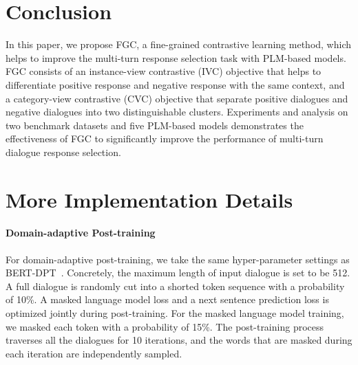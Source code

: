 \documentclass[letterpaper]{article} \usepackage{aaai22}  \usepackage{times}  \usepackage{helvet}  \usepackage{courier}  \usepackage[hyphens]{url}  \usepackage{graphicx} \urlstyle{rm} \def\UrlFont{\rm}  \usepackage{natbib}  \usepackage{caption} \DeclareCaptionStyle{ruled}{labelfont=normalfont,labelsep=colon,strut=off} \frenchspacing  \setlength{\pdfpagewidth}{8.5in}  \setlength{\pdfpageheight}{11in}  \usepackage{algorithm}
\begin{document}
\begin{table}[htbp]
\centering
{}
\caption{Model performance with data augmentation alone.}
\label{tab:augmentation_alone}
\end{table} \section{Conclusion}

In this paper, we propose FGC, a fine-grained contrastive learning method, which helps to improve the multi-turn response selection task with PLM-based models. FGC consists of an instance-view contrastive (IVC) objective that helps to differentiate positive response and negative response with the same context, and a category-view contrastive (CVC) objective that separate positive dialogues and negative dialogues into two distinguishable clusters. Experiments and analysis on two benchmark datasets and five PLM-based models demonstrates the effectiveness of FGC to significantly improve the performance of multi-turn dialogue response selection.
 


\clearpage
\appendix
\section{More Implementation Details}
\label{appendix:details}

\paragraph{Domain-adaptive Post-training} For domain-adaptive post-training, we take the same hyper-parameter settings as BERT-DPT~\cite{whang2020domain}. Concretely, the maximum length of input dialogue is set to be 512. 
A full dialogue is randomly cut into a shorted token sequence with a probability of 10\%. 
A masked language model loss and a next sentence prediction loss is optimized jointly during post-training. 
For the masked language model training, we masked each token with a probability of 15\%. The post-training process traverses all the dialogues for 10 iterations, and the words that are masked during each iteration are independently sampled. 
\end{document}
